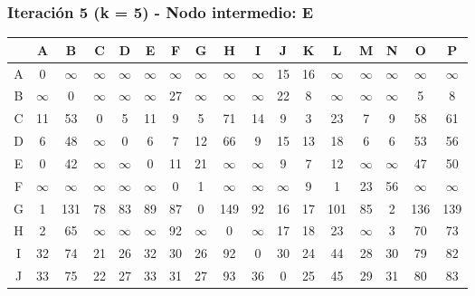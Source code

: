 \documentclass[12pt]{article}
\begin{document}
\subsubsection{Iteración 5 (k = 5) - Nodo intermedio: E}
\begin{table}[h!]
\centering
\begin{tabular}{|c|c|c|c|c|c|c|c|c|c|c|c|c|c|c|c|c|}
\hline
 & A & B & C & D & E & F & G & H & I & J & K & L & M & N & O & P \\\hline
A & 0 & $\infty$ & $\infty$ & $\infty$ & $\infty$ & $\infty$ & $\infty$ & $\infty$ & $\infty$ & 15 & 16 & $\infty$ & $\infty$ & $\infty$ & $\infty$ & $\infty$ \\\hline
B & $\infty$ & 0 & $\infty$ & $\infty$ & $\infty$ & 27 & $\infty$ & $\infty$ & $\infty$ & 22 & 8 & $\infty$ & $\infty$ & $\infty$ & 5 & 8 \\\hline
C & \cellcolor{lightgreen} 11 & \cellcolor{lightgreen} 53 & 0 & 5 & 11 & 9 & 5 & 71 & 14 & 9 & 3 & \cellcolor{lightgreen} 23 & 7 & 9 & \cellcolor{lightgreen} 58 & \cellcolor{lightgreen} 61 \\\hline
D & \cellcolor{lightgreen} 6 & \cellcolor{lightgreen} 48 & $\infty$ & 0 & 6 & 7 & 12 & 66 & 9 & \cellcolor{lightgreen} 15 & \cellcolor{lightgreen} 13 & \cellcolor{lightgreen} 18 & 6 & 6 & \cellcolor{lightgreen} 53 & \cellcolor{lightgreen} 56 \\\hline
E & 0 & 42 & $\infty$ & $\infty$ & 0 & 11 & 21 & $\infty$ & $\infty$ & 9 & 7 & 12 & $\infty$ & $\infty$ & 47 & 50 \\\hline
F & $\infty$ & $\infty$ & $\infty$ & $\infty$ & $\infty$ & 0 & 1 & $\infty$ & $\infty$ & $\infty$ & 9 & 1 & 23 & 56 & $\infty$ & $\infty$ \\\hline
G & 1 & \cellcolor{lightgreen} 131 & 78 & 83 & 89 & 87 & 0 & 149 & 92 & 16 & 17 & \cellcolor{lightgreen} 101 & 85 & 2 & \cellcolor{lightgreen} 136 & \cellcolor{lightgreen} 139 \\\hline
H & 2 & 65 & $\infty$ & $\infty$ & $\infty$ & 92 & $\infty$ & 0 & $\infty$ & 17 & 18 & 23 & $\infty$ & 3 & 70 & 73 \\\hline
I & \cellcolor{lightgreen} 32 & \cellcolor{lightgreen} 74 & 21 & 26 & 32 & 30 & 26 & 92 & 0 & 30 & 24 & \cellcolor{lightgreen} 44 & 28 & 30 & \cellcolor{lightgreen} 79 & \cellcolor{lightgreen} 82 \\\hline
J & \cellcolor{lightgreen} 33 & \cellcolor{lightgreen} 75 & 22 & 27 & 33 & 31 & 27 & 93 & 36 & 0 & 25 & \cellcolor{lightgreen} 45 & 29 & 31 & \cellcolor{lightgreen} 80 & \cellcolor{lightgreen} 83 \\\hline

\end{tabular}
\end{table}
\end{document}
